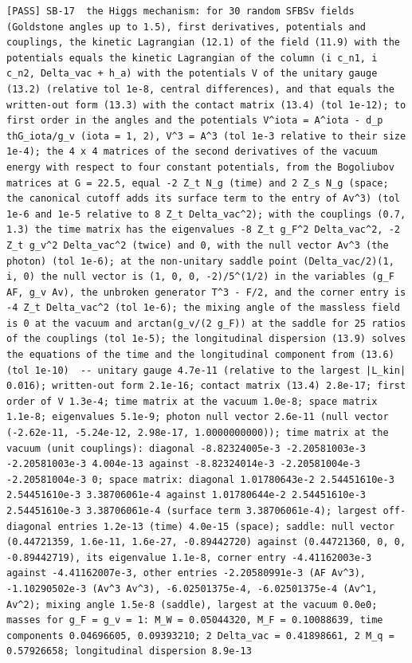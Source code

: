 \documentclass[
  10pt,
]{article}
\begin{document}
\begin{verbatim}
[PASS] SB-17  the Higgs mechanism: for 30 random SFBSv fields (Goldstone angles up to 1.5), first derivatives, potentials and couplings, the kinetic Lagrangian (12.1) of the field (11.9) with the potentials equals the kinetic Lagrangian of the column (i c_n1, i c_n2, Delta_vac + h_a) with the potentials V of the unitary gauge (13.2) (relative tol 1e-8, central differences), and that equals the written-out form (13.3) with the contact matrix (13.4) (tol 1e-12); to first order in the angles and the potentials V^iota = A^iota - d_p thG_iota/g_v (iota = 1, 2), V^3 = A^3 (tol 1e-3 relative to their size 1e-4); the 4 x 4 matrices of the second derivatives of the vacuum energy with respect to four constant potentials, from the Bogoliubov matrices at G = 22.5, equal -2 Z_t N_g (time) and 2 Z_s N_g (space; the canonical cutoff adds its surface term to the entry of Av^3) (tol 1e-6 and 1e-5 relative to 8 Z_t Delta_vac^2); with the couplings (0.7, 1.3) the time matrix has the eigenvalues -8 Z_t g_F^2 Delta_vac^2, -2 Z_t g_v^2 Delta_vac^2 (twice) and 0, with the null vector Av^3 (the photon) (tol 1e-6); at the non-unitary saddle point (Delta_vac/2)(1, i, 0) the null vector is (1, 0, 0, -2)/5^(1/2) in the variables (g_F AF, g_v Av), the unbroken generator T^3 - F/2, and the corner entry is -4 Z_t Delta_vac^2 (tol 1e-6); the mixing angle of the massless field is 0 at the vacuum and arctan(g_v/(2 g_F)) at the saddle for 25 ratios of the couplings (tol 1e-5); the longitudinal dispersion (13.9) solves the equations of the time and the longitudinal component from (13.6) (tol 1e-10)  -- unitary gauge 4.7e-11 (relative to the largest |L_kin| 0.016); written-out form 2.1e-16; contact matrix (13.4) 2.8e-17; first order of V 1.3e-4; time matrix at the vacuum 1.0e-8; space matrix 1.1e-8; eigenvalues 5.1e-9; photon null vector 2.6e-11 (null vector (-2.62e-11, -5.24e-12, 2.98e-17, 1.0000000000)); time matrix at the vacuum (unit couplings): diagonal -8.82324005e-3 -2.20581003e-3 -2.20581003e-3 4.004e-13 against -8.82324014e-3 -2.20581004e-3 -2.20581004e-3 0; space matrix: diagonal 1.01780643e-2 2.54451610e-3 2.54451610e-3 3.38706061e-4 against 1.01780644e-2 2.54451610e-3 2.54451610e-3 3.38706061e-4 (surface term 3.38706061e-4); largest off-diagonal entries 1.2e-13 (time) 4.0e-15 (space); saddle: null vector (0.44721359, 1.6e-11, 1.6e-27, -0.89442720) against (0.44721360, 0, 0,
-0.89442719), its eigenvalue 1.1e-8, corner entry -4.41162003e-3 against -4.41162007e-3, other entries -2.20580991e-3 (AF Av^3), -1.10290502e-3 (Av^3 Av^3), -6.02501375e-4, -6.02501375e-4 (Av^1, Av^2); mixing angle 1.5e-8 (saddle), largest at the vacuum 0.0e0; masses for g_F = g_v = 1: M_W = 0.05044320, M_F = 0.10088639, time components 0.04696605, 0.09393210; 2 Delta_vac = 0.41898661, 2 M_q = 0.57926658; longitudinal dispersion 8.9e-13
\end{verbatim}
\end{document}
